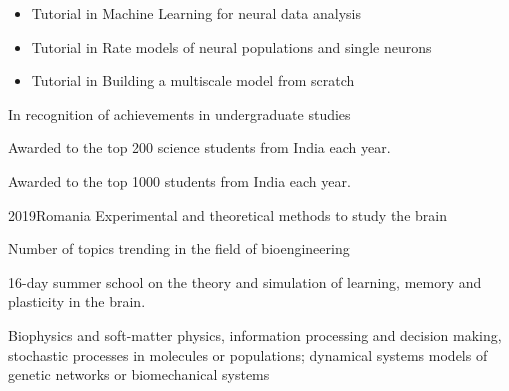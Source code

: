\documentclass[10pt,a4paper]{altacv}
\begin{document}



\begin{itemize}
\item Tutorial in Machine Learning for neural data analysis 
\item Tutorial in Rate models of neural populations and single neurons
\item Tutorial in Building a multiscale model from scratch
\end{itemize}


In recognition of achievements in undergraduate studies
\divider

Awarded to the top 200 science students from India each year.
\divider

Awarded to the top 1000 students from India each year.



 {2019}{Romania}
Experimental and theoretical methods to study the brain
\divider


Number of topics trending in the field of bioengineering
\divider

16-day summer school on the theory and simulation of learning, memory and plasticity in the brain.
\divider

Biophysics and soft-matter physics, information processing and decision
making, stochastic processes in molecules or populations; dynamical
systems models of genetic networks or biomechanical systems

\end{document}
